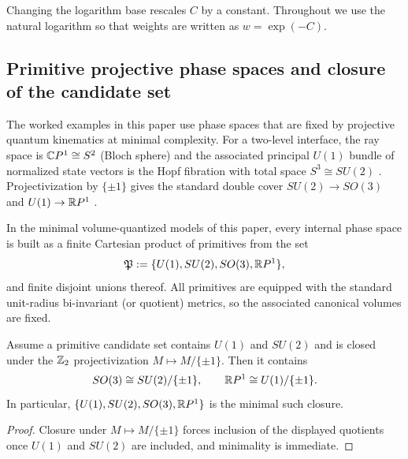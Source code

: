 \begin{remark}\label{rem:log_base_units}
Changing the logarithm base rescales $C$ by a constant. Throughout we use the natural logarithm so that weights are written as $w=\exp(-C)$.
\end{remark}

\subsection{Primitive projective phase spaces and closure of the candidate set}
The worked examples in this paper use phase spaces that are fixed by projective quantum kinematics at minimal complexity. For a two-level interface, the ray space is $\mathbb{C} P^1\cong S^2$ (Bloch sphere) and the associated principal $U(1)$ bundle of normalized state vectors is the Hopf fibration with total space $S^3\cong SU(2)$ \cite{Nakahara2003,BengtssonZyczkowski2017}. Projectivization by $\{\pm 1\}$ gives the standard double cover $SU(2)\to SO(3)$ and $U(1)\to \mathbb{R} P^1$ \cite{Hall2015}.

\begin{axiom}\label{ax:primitive_phase_spaces}
In the minimal volume-quantized models of this paper, every internal phase space is built as a finite Cartesian product of primitives from the set
\begin{equation}
\mathfrak{P}:=\{U(1),SU(2),SO(3),\mathbb{R} P^1\},
\end{equation}
and finite disjoint unions thereof. All primitives are equipped with the standard unit-radius bi-invariant (or quotient) metrics, so the associated canonical volumes are fixed.
\end{axiom}

\begin{proposition}\label{prop:primitive_set_minimality}
Assume a primitive candidate set contains $U(1)$ and $SU(2)$ and is closed under the $\mathbb{Z}_2$ projectivization $M\mapsto M/\{\pm 1\}$. Then it contains
\[
SO(3)\cong SU(2)/\{\pm 1\},\qquad
\mathbb{R} P^1\cong U(1)/\{\pm 1\}.
\]
In particular, $\{U(1),SU(2),SO(3),\mathbb{R} P^1\}$ is the minimal such closure.
\end{proposition}
\begin{proof}
Closure under $M\mapsto M/\{\pm 1\}$ forces inclusion of the displayed quotients once $U(1)$ and $SU(2)$ are included, and minimality is immediate.
\end{proof}

